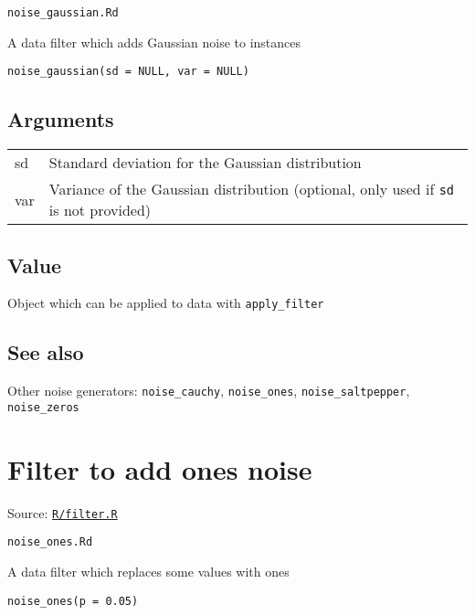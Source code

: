 \texttt{noise\_gaussian.Rd}

A data filter which adds Gaussian noise to instances

\begin{verbatim}
noise_gaussian(sd = NULL, var = NULL)
\end{verbatim}

\hypertarget{arguments}{\subsection{\texorpdfstring{\protect\hyperlink{arguments}{}Arguments}{Arguments}}\label{arguments}}

\begin{longtable}[c]{@{}ll@{}}
\toprule
sd & Standard deviation for the Gaussian distribution\tabularnewline
var & Variance of the Gaussian distribution (optional, only used if
\texttt{sd} is not provided)\tabularnewline
\bottomrule
\end{longtable}

\hypertarget{value}{\subsection{\texorpdfstring{\protect\hyperlink{value}{}Value}{Value}}\label{value}}

Object which can be applied to data with \texttt{apply\_filter}

\hypertarget{see-also}{\subsection{\texorpdfstring{\protect\hyperlink{see-also}{}See
also}{See also}}\label{see-also}}

Other noise generators: \texttt{noise\_cauchy}, \texttt{noise\_ones},
\texttt{noise\_saltpepper}, \texttt{noise\_zeros}

\section{Filter to add ones noise}\label{filter-to-add-ones-noise}

Source:
\href{https://github.com/fdavidcl/ruta/blob/master/R/filter.R}{\texttt{R/filter.R}}

\texttt{noise\_ones.Rd}

A data filter which replaces some values with ones

\begin{verbatim}
noise_ones(p = 0.05)
\end{verbatim}

